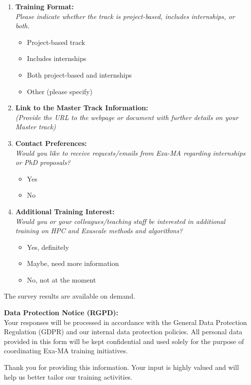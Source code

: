 \begin{enumerate}
    \item \textbf{Training Format:} \\
    \emph{Please indicate whether the track is project-based, includes internships, or both.} \\
    \begin{itemize}
        \item Project-based track
        \item Includes internships
        \item Both project-based and internships
        \item Other (please specify)
    \end{itemize}
    
    \item \textbf{Link to the Master Track Information:} \\
    \emph{(Provide the URL to the webpage or document with further details on your Master track)}
    
    \item \textbf{Contact Preferences:} \\
    \emph{Would you like to receive requests/emails from Exa-MA regarding internships or PhD proposals?} \\
    \begin{itemize}
        \item Yes
        \item No
    \end{itemize}
    
    \item \textbf{Additional Training Interest:} \\
    \emph{Would you or your colleagues/teaching staff be interested in additional training on HPC and Exascale methods and algorithms?} \\
    \begin{itemize}
        \item Yes, definitely
        \item Maybe, need more information
        \item No, not at the moment
    \end{itemize}
\end{enumerate}

\noindent The survey results are available on demand.

\vspace{1em}
\noindent \textbf{Data Protection Notice (RGPD):} \\
Your responses will be processed in accordance with the General Data Protection Regulation (GDPR) and our internal data protection policies. 
All personal data provided in this form will be kept confidential and used solely for the purpose of coordinating Exa-MA training initiatives.

\vspace{1em}
\noindent Thank you for providing this information.
Your input is highly valued and will help us better tailor our training activities.

